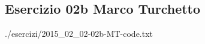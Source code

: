 
\subsection[02b MT]{Esercizio 02b Marco Turchetto}


			{./esercizi/2015_02_02-02b-MT-code.txt}
			
